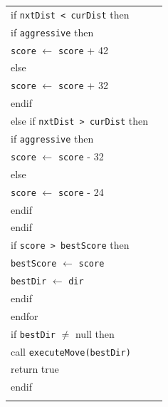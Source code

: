 \documentclass{article}
\newenvironment{pseudobox}
{
\centering
\begin{longtable}{|p{0.94\linewidth}|}
\hline
}
{
\\ \hline
\end{longtable}
\vspace{0.05cm}
}
\begin{document}
\begin{enumerate}[label=\alph*.]
\begin{enumerate}[label=\alph*.]
\begin{pseudobox}
\hspace*{3em}if \texttt{nxtDist < curDist} then \\
\hspace*{4.5em}if \texttt{aggressive} then \\
\hspace*{6em}\texttt{score} $\leftarrow$ \texttt{score} + 42 \\
\hspace*{4.5em}else \\
\hspace*{6em}\texttt{score} $\leftarrow$ \texttt{score} + 32 \\
\hspace*{4.5em}endif \\
\hspace*{3em}else if \texttt{nxtDist > curDist} then \\
\hspace*{4.5em}if \texttt{aggressive} then \\
\hspace*{6em}\texttt{score} $\leftarrow$ \texttt{score} - 32 \\
\hspace*{4.5em}else \\
\hspace*{6em}\texttt{score} $\leftarrow$ \texttt{score} - 24 \\
\hspace*{4.5em}endif \\
\hspace*{3em}endif \\

\hspace*{3em}if \texttt{score > bestScore} then \\
\hspace*{4.5em}\texttt{bestScore} $\leftarrow$ \texttt{score} \\
\hspace*{4.5em}\texttt{bestDir} $\leftarrow$ \texttt{dir} \\
\hspace*{3em}endif \\
\hspace*{1.5em}endfor \\

\hspace*{1.5em}if \texttt{bestDir} $\neq$ null then \\
\hspace*{3em}call \texttt{executeMove(bestDir)} \\
\hspace*{3em}return true \\
\hspace*{1.5em}endif \\


\end{pseudobox}
\end{enumerate}
\end{enumerate}
\end{document}
